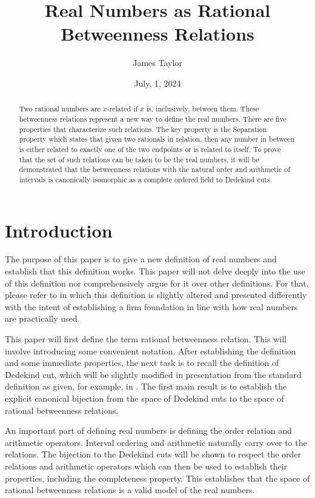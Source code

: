 \documentclass{rmj-public}
\title{Real Numbers as Rational Betweenness Relations}
\author{James Taylor}
\date{July, 1, 2024}
\begin{document}
\begin{abstract}
Two rational numbers are $x$-related if $x$ is, inclusively, between them. These betweenness relations represent a new way to define the real numbers. There are five properties that characterize such relations. The key property is the Separation property which states that given two rationals in relation, then any number in between is either related to exactly one of the two endpoints or is related to itself. To prove that the set of such relations can be taken to be the real numbers, it will be demonstrated that the betweenness relations with the natural order and arithmetic of intervals is canonically isomorphic as a complete ordered field to Dedekind cuts. 
\end{abstract}
\maketitle


\section{Introduction}

The purpose of this paper is to give a new definition of real numbers and establish that this definition works. This paper will not delve deeply into the use of this definition nor comprehensively argue for it over other definitions. For that, please refer to \cite{taylor23main} in which this definition is slightly altered and presented differently with the intent of establishing a firm foundation in line with how real numbers are practically used.

This paper will first define the term rational betweenness relation. This will involve introducing some convenient notation. After establishing the definition and some immediate properties, the next task is to recall the definition of Dedekind cut, which will be slightly modified in presentation from the standard definition as given, for example, in \cite{rudin}. The first main result is to establish the explicit canonical bijection from the space of Dedekind cuts to the space of rational betweenness relations. 

An important part of defining real numbers is defining the order relation and arithmetic operators. Interval ordering and arithmetic naturally carry over to the relations. The bijection to the Dedekind cuts will be shown to respect the order relations and arithmetic operators which can then be used to establish their properties, including the completeness property.   This establishes that the space of rational betweenness relations is a valid model of the real numbers. 
\end{document}
